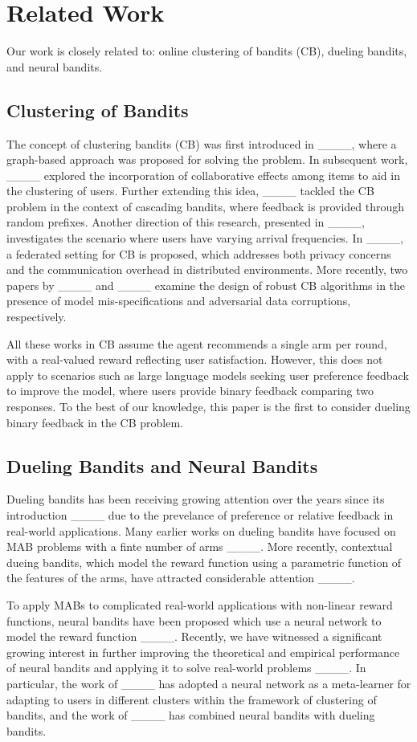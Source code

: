 \section{Related Work}
\vspace{-1.5mm}
Our work is closely related to: online clustering of bandits (CB), dueling bandits, and neural bandits.

\subsection{Clustering of Bandits}
The concept of clustering bandits (CB) was first introduced in ____, where a graph-based approach was proposed for solving the problem. In subsequent work, ____ explored the incorporation of collaborative effects among items to aid in the clustering of users. Further extending this idea, ____ tackled the CB problem in the context of cascading bandits, where feedback is provided through random prefixes. Another direction of this research, presented in ____, investigates the scenario where users have varying arrival frequencies. In ____, a federated setting for CB is proposed, which addresses both privacy concerns and the communication overhead in distributed environments. More recently, two papers by ____ and ____ examine the design of robust CB algorithms in the presence of model mis-specifications and adversarial data corruptions, respectively.

All these works in CB assume the agent recommends a single arm per round, with a real-valued reward reflecting user satisfaction. However, this does not apply to scenarios such as large language models seeking user preference feedback to improve the model, where users provide binary feedback comparing two responses. To the best of our knowledge, this paper is the first to consider dueling binary feedback in the CB problem.

\subsection{Dueling Bandits and Neural Bandits}
Dueling bandits has been receiving growing attention over the years since its introduction ____ due to the prevelance of preference or relative feedback in real-world applications.
Many earlier works on dueling bandits have focused on MAB problems with a finte number of arms ____.
More recently, contextual dueing bandits, which model the reward function using a parametric function of the features of the arms, have attracted considerable attention ____.

To apply MABs to complicated real-world applications with non-linear reward functions, neural bandits have been proposed which use a neural network to model the reward function ____.
Recently, we have witnessed a significant growing interest in further improving the theoretical and empirical performance of neural bandits and applying it to solve real-world problems ____.
In particular, the work of ____ has adopted a neural network as a meta-learner for adapting to users in different clusters within the framework of clustering of bandits, and the work of ____ has combined neural bandits with dueling bandits.